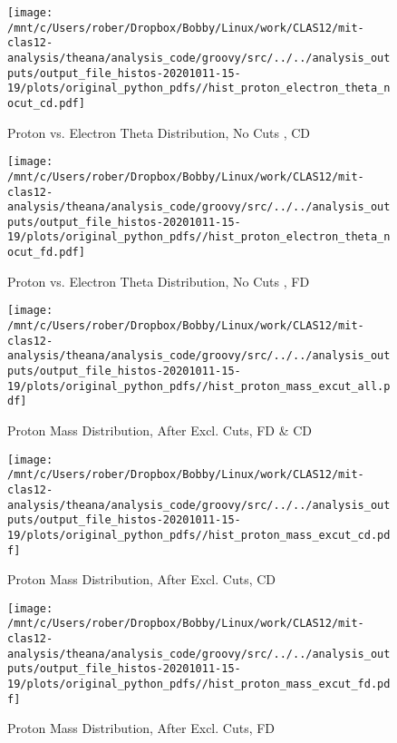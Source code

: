 \documentclass{article}
\begin{document}
\begin{landscape}
\begin{figure}[h]
        \texttt{[image: /mnt/c/Users/rober/Dropbox/Bobby/Linux/work/CLAS12/mit-clas12-analysis/theana/analysis\_code/groovy/src/../../analysis\_outputs/output\_file\_histos-20201011-15-19/plots/original\_python\_pdfs//hist\_proton\_electron\_theta\_nocut\_cd.pdf]}
        \captionsetup{textformat=empty,labelformat=blank}
        \caption{Proton vs. Electron Theta Distribution, No Cuts , CD}
    \end{figure}
    \clearpage
    
    \begin{figure}[h]
        \centering

        \texttt{[image: /mnt/c/Users/rober/Dropbox/Bobby/Linux/work/CLAS12/mit-clas12-analysis/theana/analysis\_code/groovy/src/../../analysis\_outputs/output\_file\_histos-20201011-15-19/plots/original\_python\_pdfs//hist\_proton\_electron\_theta\_nocut\_fd.pdf]}
        \captionsetup{textformat=empty,labelformat=blank}
        \caption{Proton vs. Electron Theta Distribution, No Cuts , FD}
    \end{figure}
    \clearpage
    
    \begin{figure}[h]
        \centering

        \texttt{[image: /mnt/c/Users/rober/Dropbox/Bobby/Linux/work/CLAS12/mit-clas12-analysis/theana/analysis\_code/groovy/src/../../analysis\_outputs/output\_file\_histos-20201011-15-19/plots/original\_python\_pdfs//hist\_proton\_mass\_excut\_all.pdf]}
        \captionsetup{textformat=empty,labelformat=blank}
        \caption{Proton Mass Distribution, After Excl. Cuts, FD \& CD}
    \end{figure}
    \clearpage
    
    \begin{figure}[h]
        \centering

        \texttt{[image: /mnt/c/Users/rober/Dropbox/Bobby/Linux/work/CLAS12/mit-clas12-analysis/theana/analysis\_code/groovy/src/../../analysis\_outputs/output\_file\_histos-20201011-15-19/plots/original\_python\_pdfs//hist\_proton\_mass\_excut\_cd.pdf]}
        \captionsetup{textformat=empty,labelformat=blank}
        \caption{Proton Mass Distribution, After Excl. Cuts, CD}
    \end{figure}
    \clearpage
    
    \begin{figure}[h]
        \centering

        \texttt{[image: /mnt/c/Users/rober/Dropbox/Bobby/Linux/work/CLAS12/mit-clas12-analysis/theana/analysis\_code/groovy/src/../../analysis\_outputs/output\_file\_histos-20201011-15-19/plots/original\_python\_pdfs//hist\_proton\_mass\_excut\_fd.pdf]}
        \captionsetup{textformat=empty,labelformat=blank}
        \caption{Proton Mass Distribution, After Excl. Cuts, FD}
    \end{figure}
    \clearpage
    

\end{landscape}
\end{document}
